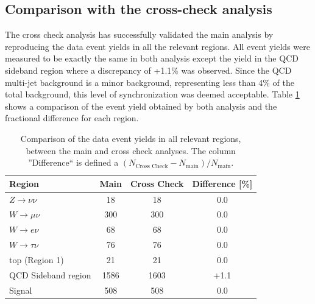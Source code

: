 \clearpage

\subsection{Comparison with the cross-check analysis}


The cross check analysis has successfully validated the main analysis by reproducing the data event yields in all the relevant regions. All event yields were measured to be exactly the same in both analysis except the yield in the \gls{QCD} sideband region where a discrepancy of +1.1\% was observed. Since the \gls{QCD} multi-jet background is a minor background, representing less than 4\% of the total background, this level of synchronization was deemed acceptable. Table \ref{TABLE:ParkedDataAnalysis_Results_MainCrossCheckComparison} shows a comparison of the event yield obtained by both analysis and the fractional difference for each region.

\begin{table}[!htb]
\centering
\begin{tabular}{|l|c|c|c|}
\hline
Region                & Main & Cross Check & Difference [\%] \\
\hline\hline
$Z\rightarrow\nu\nu$  &   18 &          18 &             0.0 \\
$W\rightarrow\mu\nu$  &  300 &         300 &             0.0 \\
$W\rightarrow e\nu$   &   68 &          68 &             0.0 \\
$W\rightarrow\tau\nu$ &   76 &          76 &             0.0 \\
top (Region 1)        &   21 &          21 &             0.0 \\
QCD Sideband region   & 1586 &        1603 &            +1.1 \\
\hline\hline
Signal                &  508 &         508 &             0.0 \\
\hline
\end{tabular}
\caption{Comparison of the data event yields in all relevant regions, between the main and cross check analyses. The column ''Difference`` is defined a $(N_{\text{Cross Check}}-N_{\text{main}})/N_{\text{main}}$.}
\label{TABLE:ParkedDataAnalysis_Results_MainCrossCheckComparison}
\end{table}

